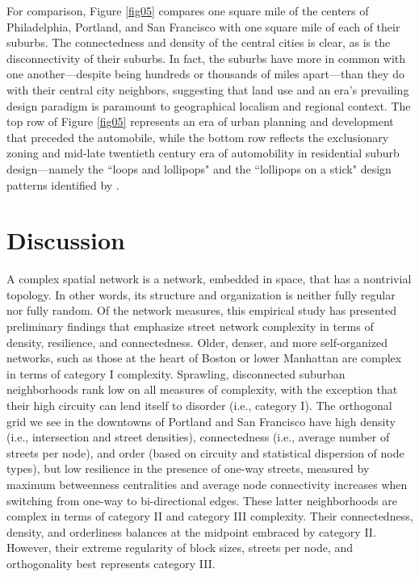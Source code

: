 \documentclass[Afour,sageh,times]{sage/sagej}
\begin{document}
For comparison, Figure \ref{fig05} compares one square mile of the centers of Philadelphia, Portland, and San Francisco with one square mile of each of their suburbs. The connectedness and density of the central cities is clear, as is the disconnectivity of their suburbs. In fact, the suburbs have more in common with one another---despite being hundreds or thousands of miles apart---than they do with their central city neighbors, suggesting that land use and an era's prevailing design paradigm is paramount to geographical localism and regional context. The top row of Figure \ref{fig05} represents an era of urban planning and development that preceded the automobile, while the bottom row reflects the exclusionary zoning and mid-late twentieth century era of automobility in residential suburb design---namely the ``loops and lollipops" and the ``lollipops on a stick" design patterns identified by \citet{southworth_streets_1997}.

\section{Discussion}

A complex spatial network is a network, embedded in space, that has a nontrivial topology. In other words, its structure and organization is neither fully regular nor fully random. Of the network measures, this empirical study has presented preliminary findings that emphasize street network complexity in terms of density, resilience, and connectedness. Older, denser, and more self-organized networks, such as those at the heart of Boston or lower Manhattan are complex in terms of category I complexity. Sprawling, disconnected suburban neighborhoods rank low on all measures of complexity, with the exception that their high circuity can lend itself to disorder (i.e., category I). The orthogonal grid we see in the downtowns of Portland and San Francisco have high density (i.e., intersection and street densities), connectedness (i.e., average number of streets per node), and order (based on circuity and statistical dispersion of node types), but low resilience in the presence of one-way streets, measured by maximum betweenness centralities and average node connectivity increases when switching from one-way to bi-directional edges. These latter neighborhoods are complex in terms of category II and category III complexity. Their connectedness, density, and orderliness balances at the midpoint embraced by category II. However, their extreme regularity of block sizes, streets per node, and orthogonality best represents category III.
\end{document}
